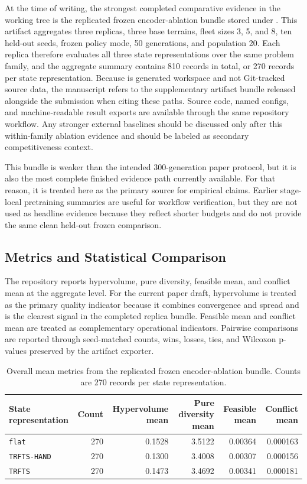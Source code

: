 \documentclass[a4paper,fleqn]{cas-dc}
\begin{document}
At the time of writing, the strongest completed comparative evidence in the working tree is the replicated frozen encoder-ablation bundle stored under . This artifact aggregates three replicas, three base terrains, fleet sizes 3, 5, and 8, ten held-out seeds, frozen policy mode, 50 generations, and population 20. Each replica therefore evaluates all three state representations over the same problem family, and the aggregate summary contains 810 records in total, or 270 records per state representation. Because  is generated workspace and not Git-tracked source data, the manuscript refers to the supplementary artifact bundle released alongside the submission when citing these paths. Source code, named configs, and machine-readable result exports are available through the same repository workflow. Any stronger external baselines should be discussed only after this within-family ablation evidence and should be labeled as secondary competitiveness context.

This bundle is weaker than the intended 300-generation paper protocol, but it is also the most complete finished evidence path currently available. For that reason, it is treated here as the primary source for empirical claims. Earlier stage-local pretraining summaries are useful for workflow verification, but they are not used as headline evidence because they reflect shorter budgets and do not provide the same clean held-out frozen comparison.

\subsection{Metrics and Statistical Comparison}

The repository reports hypervolume, pure diversity, feasible mean, and conflict mean at the aggregate level. For the current paper draft, hypervolume is treated as the primary quality indicator because it combines convergence and spread and is the clearest signal in the completed replica bundle. Feasible mean and conflict mean are treated as complementary operational indicators. Pairwise comparisons are reported through seed-matched counts, wins, losses, ties, and Wilcoxon p-values preserved by the artifact exporter.

\begin{table}[t]
\centering
\small
\caption{Overall mean metrics from the replicated frozen encoder-ablation bundle. Counts are 270 records per state representation.}
\label{tab:overall_modes}
\begin{tabular}{lrrrrr}
\toprule
State representation & Count & Hypervolume mean & Pure diversity mean & Feasible mean & Conflict mean \\
\midrule
\texttt{flat} & 270 & 0.1528 & 3.5122 & 0.00364 & 0.000163 \\
\texttt{TRFTS-HAND} & 270 & 0.1300 & 3.4008 & 0.00307 & 0.000156 \\
\texttt{TRFTS} & 270 & 0.1473 & 3.4692 & 0.00341 & 0.000181 \\
\bottomrule
\end{tabular}
\end{table}
\end{document}
